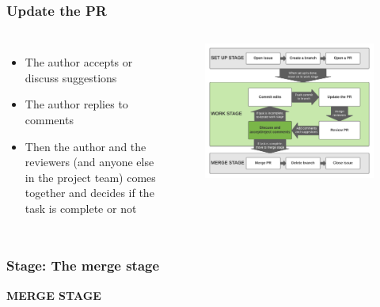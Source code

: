 \documentclass[aspectratio=169]{beamer} %
\begin{document}
\begin{frame}
	\frametitle{Update the PR}
	\begin{columns}[c]
		
		\begin{itemize}
			\setlength\itemsep{1em}
			\item The author accepts or discuss suggestions
			\item The author replies to comments
			\item Then the author and the reviewers (and anyone else in the project team) comes together and decides if the task is complete or not
		\end{itemize}
		
		\vspace{-.75cm}
		\begin{figure}
			\centering
			\includegraphics[width=\textwidth]{./img/branch-pr-merge-cycle-S2-4.png}
		\end{figure}
		
	\end{columns}
\end{frame}


\begin{frame}
	\frametitle{Stage: The merge stage}
	
	\huge\centering \textbf{MERGE STAGE}
	
\end{frame}
\end{document}
